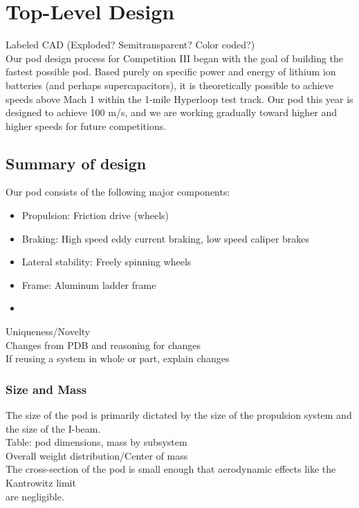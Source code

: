 \documentclass{report}
\begin{document}
    \chapter{Top-Level Design}
    Labeled CAD (Exploded? Semitransparent? Color coded?)\\
    
    Our pod design process for Competition III began with the goal of building the fastest possible pod. Based purely on specific power and energy of lithium ion batteries (and perhaps supercapacitors), it is theoretically possible to achieve speeds above Mach 1 within the 1-mile Hyperloop test track. Our pod this year is designed to achieve 100 m/s, and we are working gradually toward higher and higher speeds for future competitions.
    
    
    \section{Summary of design}
    Our pod consists of the following major components:
    \begin{itemize}
        \item Propulsion: Friction drive (wheels)
        \item Braking: High speed eddy current braking, low speed caliper brakes
        \item Lateral stability: Freely spinning wheels
        \item Frame: Aluminum ladder frame
        \item
    \end{itemize}
    Uniqueness/Novelty\\
    Changes from PDB and reasoning for changes\\
    If reusing a system in whole or part, explain changes\\
    
    \subsection{Size and Mass}
    The size of the pod is primarily dictated by the size of the propulsion system and the size of the I-beam.\\
    Table: pod dimensions, mass by subsystem\\
    Overall weight distribution/Center of mass\\
    The cross-section of the pod is small enough that aerodynamic effects like the Kantrowitz limit\\
    are negligible.\\
    
\end{document}
